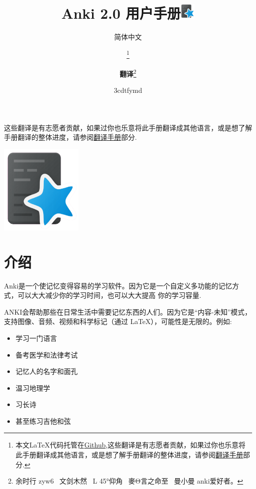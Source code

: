 \documentclass[a4paper]{book}
\title{Anki 2.0 用户手册\includegraphics[width=1em]{figures/CREATINGCUSTOM-NOTE-TYPESIN-ANKI1.png}}
\author{简体中文}
\title{\textbf{\savedtitle}}
\author{\textbf{\savedauthor}\thanks{本文\LaTeX{}代码托管在\href{https://github.com/xiaoleeza/Ankihelp}{Github},这些翻译是有志愿者贡献，如果过你也乐意将此手册翻译成其他语言，或是想了解手册翻译的整体进度，请参阅\hyperref[translatingmanual]{翻译手册}部分.}\and \textbf{翻译}\thanks{\ttfamily 余时行
		zyw6~
		文剑木然~
		L
		45°\hspace{-.1ex}仰角~
		麥\hspace{-.07ex}Θ\hspace{-.07ex}言之命至~
		曼小曼
		anki\hspace{-.07ex}爱好者。}}
\date{\w3cdtfymd}
\makeatletter
\let\savedauthor=\@author
\let\savedtitle=\@title
\newcounter{tab}[chapter]
\makeatother
\begin{document}
	\frontmatter
	\maketitle
	\thispagestyle{empty}
	\setcounter{tocdepth}{4}
	\tableofcontents\newpage\thispagestyle{empty}
	
	\mainmatter
	\fancyhf{}
	\fancyhead[LE]{{\small\leftmark}}
	\fancyhead[RO]{{\small\rightmark}}
	\fancyhead[RE,LO]{{\small\savedauthor\hspace*{1ex}\textbf{\savedtitle}}}
	\fancyfoot[LE,RO]{\small\textbf\thepage}
	\pagestyle{fancy}
	
	
	这些翻译是有志愿者贡献，如果过你也乐意将此手册翻译成其他语言，或是想了解手册翻译的整体进度，请参阅\hyperref[translatingmanual]{翻译手册}部分.
	\vfill
	\begin{center}
	\hfill\includegraphics[width=0.3\textwidth]{figures/CREATINGCUSTOM-NOTE-TYPESIN-ANKI1.png}
	\end{center}
	
	\chapter{介绍}
	
	Anki是一个使记忆变得容易的学习软件。因为它是一个自定义多功能的记忆方式，可以大大减少你的学习时间，也可以大大提高 你的学习容量.
	
	ANKI会帮助那些在日常生活中需要记忆东西的人们。因为它是“内容-未知”模式，支持图像、音频、视频和科学标记（通过 \LaTeX{}），可能性是无限的。例如:
	
	\begin{itemize}
		\itemsep1pt\parskip0pt
		\item 学习一门语言
		\item 备考医学和法律考试
		\item 记忆人的名字和面孔
		\item 温习地理学
		\item 习长诗
		\item 甚至练习吉他和弦
	\end{itemize}
	
\end{document}
